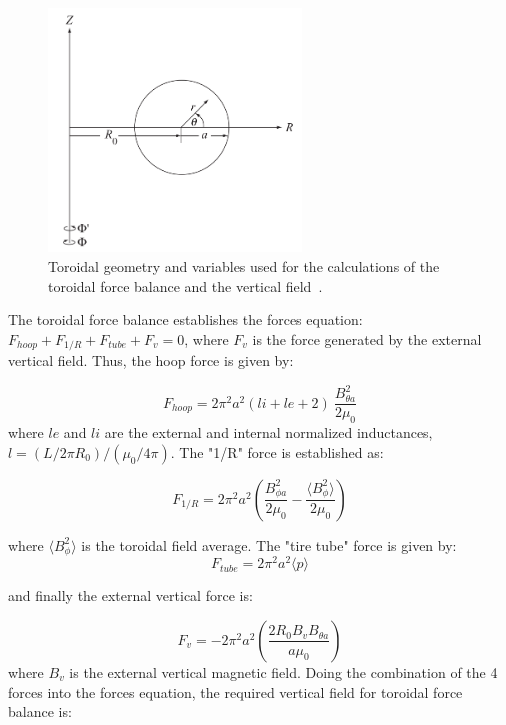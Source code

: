 \begin{figure}
	\centering
	\includegraphics[width=0.6\textwidth]{Chp1/toroidal_geo.png}
	\caption{  Toroidal geometry and variables used for the calculations of the toroidal force balance and the vertical field~\cite[Chapter~11]{Freidberg2007}.\label{tor_geo}}
\end{figure}


The toroidal force balance establishes the forces equation: $F_{hoop}+ F_{1/R} + F_{tube}+ F_{v} =0$, where $F_v$ is the force generated by the external vertical field. Thus, the hoop force is given by:

\begin{equation}
F_{hoop}=2\pi^2a^2(li+le+2)~\frac{B_{\theta a}^2}{2\mu_0}
\end{equation}
 where $le$ and $li$ are the external and internal normalized inductances, $l= (L/2\pi R_0)/(\mu_0/4\pi)$. The "1/R" force is established as:
 
 \begin{equation}
 F_{1/R}=2\pi^2a^2 \left(\frac{ B_{\phi a}^2}{2\mu_0 }-\frac{\langle B_{\phi}^2 \rangle}{ 2\mu_0}\right)
 \end{equation}

where $\langle B_{\phi}^2 \rangle$ is the toroidal field average. The "tire tube" force is given by:
\begin{equation}
F_{tube}=2\pi^2a^2\langle p \rangle
\end{equation}

and finally the external vertical force is:

\begin{equation}
F_v=-2\pi^2a^2\left(\frac{2R_0 B_v B_{\theta a}}{a\mu_0}\right)
\end{equation}
 where $B_v$ is the external vertical magnetic field. Doing the combination of the 4 forces into the forces equation, the required vertical field for toroidal force balance is:
 
